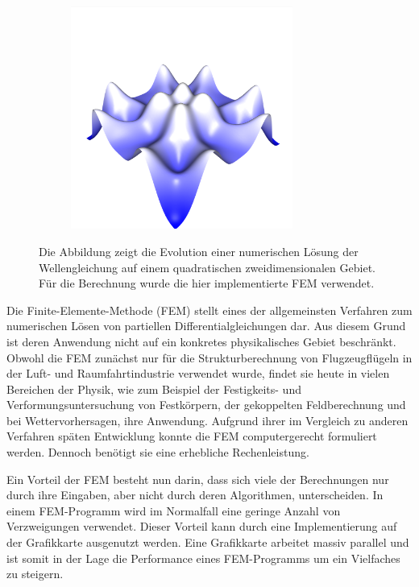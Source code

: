 \documentclass[crop=false]{standalone}
\begin{document}
\begin{figure}[h]
\begin{subfigure}[b]{0.32\textwidth}
        \center
        \includegraphics[trim={0 0 0 2.2cm}, clip, width=0.8\textwidth]{images/intro_06.png}
        \caption{}
      \end{subfigure}
      \caption[%
        Einfache Simulation der Wellengleichung%
      ]{%
        Die Abbildung zeigt die Evolution einer numerischen Lösung der Wellengleichung auf einem quadratischen zweidimensionalen Gebiet.
        Für die Berechnung wurde die hier implementierte FEM verwendet.%
      }
      \label{fig:intro}
    \end{figure}

    Die Finite-Elemente-Methode (FEM) stellt eines der allgemeinsten Verfahren zum numerischen Lösen von partiellen Differentialgleichungen dar.
    Aus diesem Grund ist deren Anwendung nicht auf ein konkretes physikalisches Gebiet beschränkt.
    Obwohl die FEM zunächst nur für die Strukturberechnung von Flugzeugflügeln in der Luft- und Raumfahrtindustrie verwendet wurde, findet sie heute in vielen Bereichen der Physik, wie zum Beispiel der Festigkeits- und Verformungsuntersuchung von Festkörpern, der gekoppelten Feldberechnung und bei Wettervorhersagen, ihre Anwendung.
    Aufgrund ihrer im Vergleich zu anderen Verfahren späten Entwicklung konnte die FEM computergerecht formuliert werden.
    Dennoch benötigt sie eine erhebliche Rechenleistung.

    Ein Vorteil der FEM besteht nun darin, dass sich viele der Berechnungen nur durch ihre Eingaben, aber nicht durch deren Algorithmen, unterscheiden.
    In einem FEM-Programm wird im Normalfall eine geringe Anzahl von Verzweigungen verwendet.
    Dieser Vorteil kann durch eine Implementierung auf der Grafikkarte ausgenutzt werden.
    Eine Grafikkarte arbeitet massiv parallel und ist somit in der Lage die Performance eines FEM-Programms um ein Vielfaches zu steigern.

\end{document}
